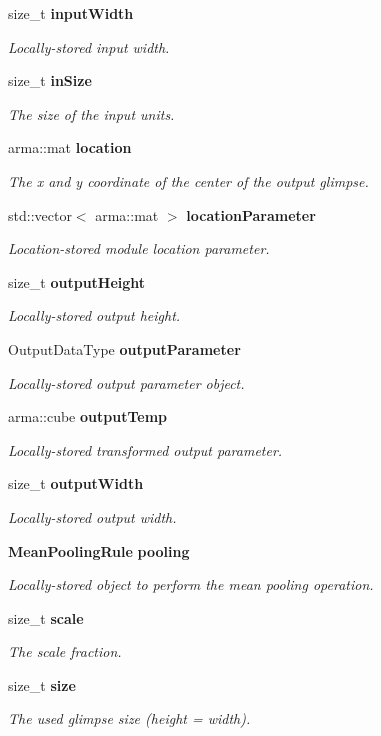 \begin{DoxyCompactItemize}
size\+\_\+t {\bf input\+Width}
\begin{DoxyCompactList}\small\item\em Locally-\/stored input width. \end{DoxyCompactList}\item 
size\+\_\+t {\bf in\+Size}
\begin{DoxyCompactList}\small\item\em The size of the input units. \end{DoxyCompactList}\item 
arma\+::mat {\bf location}
\begin{DoxyCompactList}\small\item\em The x and y coordinate of the center of the output glimpse. \end{DoxyCompactList}\item 
std\+::vector$<$ arma\+::mat $>$ {\bf location\+Parameter}
\begin{DoxyCompactList}\small\item\em Location-\/stored module location parameter. \end{DoxyCompactList}\item 
size\+\_\+t {\bf output\+Height}
\begin{DoxyCompactList}\small\item\em Locally-\/stored output height. \end{DoxyCompactList}\item 
Output\+Data\+Type {\bf output\+Parameter}
\begin{DoxyCompactList}\small\item\em Locally-\/stored output parameter object. \end{DoxyCompactList}\item 
arma\+::cube {\bf output\+Temp}
\begin{DoxyCompactList}\small\item\em Locally-\/stored transformed output parameter. \end{DoxyCompactList}\item 
size\+\_\+t {\bf output\+Width}
\begin{DoxyCompactList}\small\item\em Locally-\/stored output width. \end{DoxyCompactList}\item 
{\bf Mean\+Pooling\+Rule} {\bf pooling}
\begin{DoxyCompactList}\small\item\em Locally-\/stored object to perform the mean pooling operation. \end{DoxyCompactList}\item 
size\+\_\+t {\bf scale}
\begin{DoxyCompactList}\small\item\em The scale fraction. \end{DoxyCompactList}\item 
size\+\_\+t {\bf size}
\begin{DoxyCompactList}\small\item\em The used glimpse size (height = width). \end{DoxyCompactList}\end{DoxyCompactItemize}


